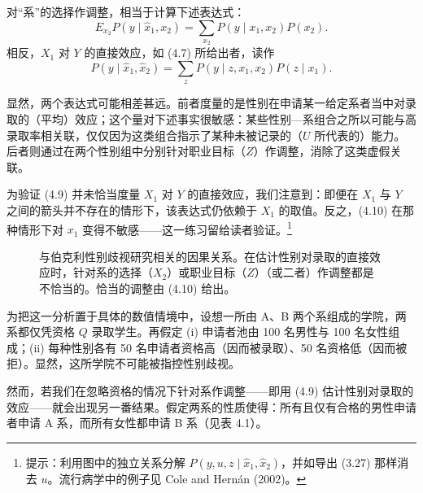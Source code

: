 对“系”的选择作调整，相当于计算下述表达式：
\begin{equation}
E_{x_2}P(y\mid\hat{x}_1,x_2)=\sum_{x_2}P(y\mid x_1,x_2)P(x_2). \tag{4.9}
\end{equation}
相反，$X_1$ 对 $Y$ 的直接效应，如 \textup{(4.7)} 所给出者，读作
\begin{equation}
P(y\mid\hat{x}_1,\hat{x}_2)=\sum_z P(y\mid z,x_1,x_2)P(z\mid x_1). \tag{4.10}
\end{equation}

显然，两个表达式可能相差甚远。前者度量的是性别在申请某一给定系者当中对录取的（平均）效应；这个量对下述事实很敏感：某些性别—系组合之所以可能与高录取率相关联，仅仅因为这类组合指示了某种未被记录的（$U$ 所代表的）能力。后者则通过在两个性别组中分别针对职业目标（$Z$）作调整，消除了这类虚假关联。

为验证 \textup{(4.9)} 并未恰当度量 $X_1$ 对 $Y$ 的直接效应，我们注意到：即便在 $X_1$ 与 $Y$ 之间的箭头并不存在的情形下，该表达式仍依赖于 $X_1$ 的取值。反之，\textup{(4.10)} 在那种情形下对 $x_1$ 变得不敏感——这一练习留给读者验证。\footnote{提示：利用图中的独立关系分解 $P(y,u,z\mid\hat{x}_1,\hat{x}_2)$，并如导出 \textup{(3.27)} 那样消去 $u$。流行病学中的例子见 Cole and Hernán (2002)。}

\begin{figure}[htbp]
\centering
{}
\caption{与伯克利性别歧视研究相关的因果关系。在估计性别对录取的直接效应时，针对系的选择（$X_2$）或职业目标（$Z$）（或二者）作调整都是不恰当的。恰当的调整由 \textup{(4.10)} 给出。}
\label{fig:4.9}
\end{figure}

为把这一分析置于具体的数值情境中，设想一所由 A、B 两个系组成的学院，两系都仅凭资格 $Q$ 录取学生。再假定 (i) 申请者池由 100 名男性与 100 名女性组成；(ii) 每种性别各有 50 名申请者资格高（因而被录取）、50 名资格低（因而被拒）。显然，这所学院不可能被指控性别歧视。

然而，若我们在忽略资格的情况下针对系作调整——即用 \textup{(4.9)} 估计性别对录取的效应——就会出现另一番结果。假定两系的性质使得：所有且仅有合格的男性申请者申请 A 系，而所有女性都申请 B 系（见表 4.1）。

